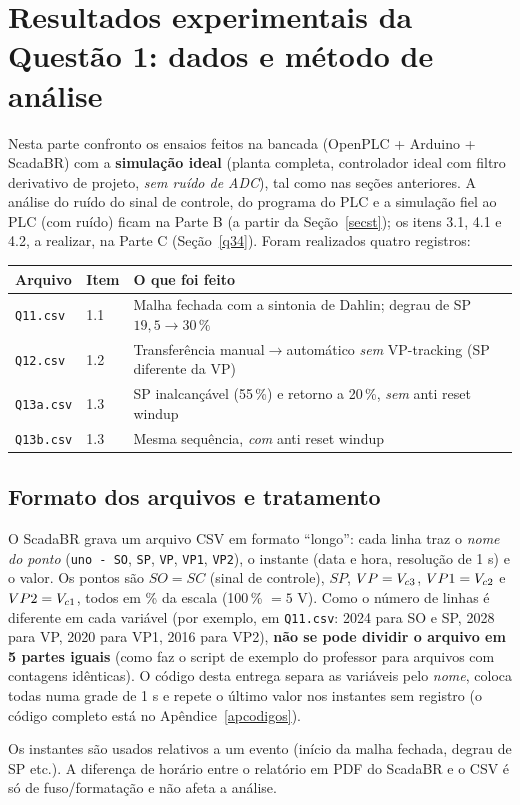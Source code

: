 \section{Resultados experimentais da Questão 1: dados e método de análise}\label{expdados}
Nesta parte confronto os ensaios feitos na bancada (OpenPLC + Arduino + ScadaBR) com a \textbf{simulação ideal} (planta completa, controlador ideal com filtro derivativo de projeto, \emph{sem ruído de ADC}), tal como nas seções anteriores. A análise do ruído do sinal de controle, do programa do PLC e a simulação fiel ao PLC (com ruído) ficam na Parte B (a partir da Seção~\ref{secst}); os itens 3.1, 4.1 e 4.2, a realizar, na Parte C (Seção~\ref{q34}). Foram realizados quatro registros:
\begin{center}\small
\begin{tabular}{llp{8.2cm}}\toprule Arquivo & Item & O que foi feito\\\midrule
\texttt{Q11.csv} & 1.1 & Malha fechada com a sintonia de Dahlin; degrau de SP $19{,}5\to30\,\%$\\
\texttt{Q12.csv} & 1.2 & Transferência manual$\to$automático \emph{sem} VP-tracking (SP diferente da VP)\\
\texttt{Q13a.csv} & 1.3 & SP inalcançável (55\,\%) e retorno a 20\,\%, \emph{sem} anti reset windup\\
\texttt{Q13b.csv} & 1.3 & Mesma sequência, \emph{com} anti reset windup\\\bottomrule\end{tabular}\end{center}

\subsection{Formato dos arquivos e tratamento}
O ScadaBR grava um arquivo CSV em formato ``longo'': cada linha traz o \emph{nome do ponto} (\texttt{uno - SO}, \texttt{SP}, \texttt{VP}, \texttt{VP1}, \texttt{VP2}), o instante (data e hora, resolução de 1 s) e o valor. Os pontos são $SO=SC$ (sinal de controle), $SP$, $VP=V_{c3}$, $VP1=V_{c2}$ e $VP2=V_{c1}$, todos em \% da escala (100\,\% $=5$ V). Como o número de linhas é diferente em cada variável (por exemplo, em \texttt{Q11.csv}: 2024 para SO e SP, 2028 para VP, 2020 para VP1, 2016 para VP2), \textbf{não se pode dividir o arquivo em 5 partes iguais} (como faz o script de exemplo do professor para arquivos com contagens idênticas). O código desta entrega separa as variáveis pelo \emph{nome}, coloca todas numa grade de 1 s e repete o último valor nos instantes sem registro (o código completo está no Apêndice~\ref{apcodigos}).
\begin{just}Os instantes são usados relativos a um evento (início da malha fechada, degrau de SP etc.). A diferença de horário entre o relatório em PDF do ScadaBR e o CSV é só de fuso/formatação e não afeta a análise.\end{just}

